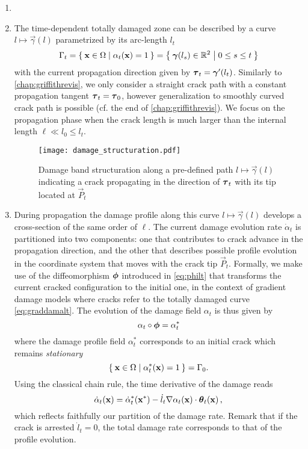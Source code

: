 \begin{hypothesis} \label{hypo:damageband}
\begin{enumerate}
\item[]
\item The time-dependent totally damaged zone can be described by a curve $l\mapsto\vec{\gamma}(l)$ parametrized by its arc-length $l_t$
\begin{equation} \label{eq:graddamalt}
\Gamma_t=\set{\vec{x}\in\Omega|\alpha_t(\vec{x})=1}=\set{\vec{\gamma}(l_s)\in\mathbb{R}^2|0\leq s\leq t}
\end{equation}
with the current propagation direction given by $\vtau_t=\vec{\gamma}'(l_t)$. Similarly to \cref{chap:griffithrevis}, we only consider a straight crack path with a constant propagation tangent $\vtau_t=\vtau_0$, however generalization to smoothly curved crack path is possible (cf. the end of \cref{chap:griffithrevis}). We focus on the propagation phase when the crack length is much larger than the internal length $\ell\ll l_0\leq l_t$.
\begin{figure}[htbp]
\centering
\texttt{[image: damage\_structuration.pdf]}
\caption{Damage band structuration along a pre-defined path $l\mapsto\vec{\gamma}(l)$ indicating a crack propagating in the direction of $\vtau_t$ with its tip located at $\vec{P}_t$} \label{fig:damage_structuration}
\end{figure}

\item During propagation the damage profile along this curve $l\mapsto\vec{\gamma}(l)$ develops a cross-section of the same order of $\ell$. The current damage evolution rate $\dot{\alpha}_t$ is partitioned into two components: one that contributes to crack advance in the propagation direction, and the other that describes possible profile evolution in the coordinate system that moves with the crack tip $\vec{P}_t$. Formally, we make use of the diffeomorphism $\philt$ introduced in \eqref{eq:philt} that transforms the current cracked configuration to the initial one, in the context of gradient damage models where cracks refer to the totally damaged curve \eqref{eq:graddamalt}. The evolution of the damage field $\alpha_t$ is thus given by
\begin{equation} \label{eq:transportofdamage}
\alpha_t\circ\philt=\alpha_t^*
\end{equation}
where the damage profile field $\alpha_t^*$ corresponds to an initial crack which remains \emph{stationary}
\[
\set{\vec{x}\in\Omega|\alpha_t^*(\vec{x})=1}=\Gamma_0.
\]
Using the classical chain rule, the time derivative of the damage reads
\begin{equation} \label{eq:alphadot}
\dot{\alpha}_t(\vec{x})=\dot{\alpha}_t^*(\vec{x}^*)-\dot{l}_t\nabla\alpha_t(\vec{x})\cdot\vtheta_t(\vec{x})\,,
\end{equation}
which reflects faithfully our partition of the damage rate. Remark that if the crack is arrested $\dot{l}_t=0$, the total damage rate corresponds to that of the profile evolution.
\end{enumerate}
\end{hypothesis}

